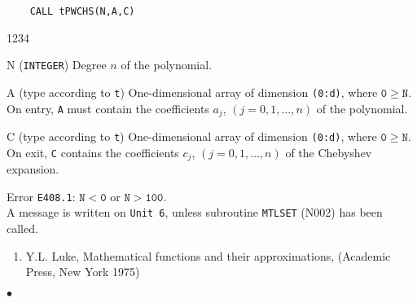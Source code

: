 \begin{verbatim}
    CALL tPWCHS(N,A,C)
\end{verbatim}
\begin{DLtt}{1234}
\item[N] ({\tt INTEGER}) Degree $n$ of the polynomial.
\item[A] (type according to {\tt t}) One-dimensional array of dimension
{\tt (0:d)}, where $\mathtt{0 \ge N}$. On entry, {\tt A} must contain
the coefficients $a_j$, $(j=0,1,\ldots,n)$ of the polynomial.
\item[C] (type according to {\tt t}) One-dimensional array of dimension
{\tt (0:d)}, where $\mathtt{0 \ge N}$. On exit, {\tt C} contains the
coefficients $c_j$, $(j=0,1,\ldots,n)$ of the Chebyshev expansion.
\end{DLtt}
\Errorh
Error {\tt E408.1}: $\mathtt{N<0}$ or $\mathtt{N>100}$. \\
A message is written on {\tt Unit 6}, unless subroutine {\tt MTLSET}
(N002) has been called.
\Refer
\begin{enumerate}
\item Y.L. Luke, Mathematical functions and their approximations,
(Academic Press, New York 1975)
\end{enumerate}
$\bullet$

